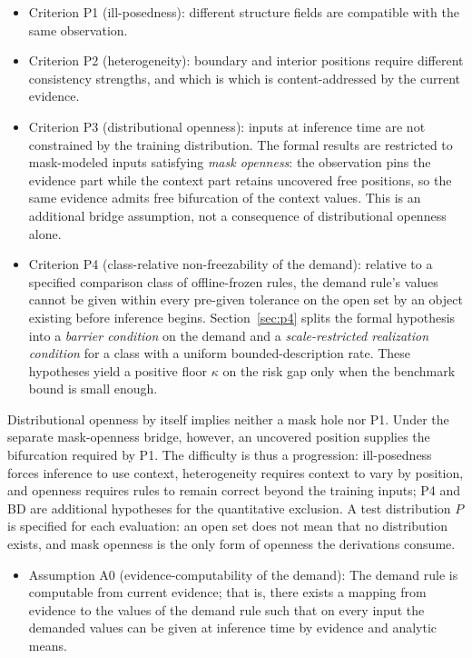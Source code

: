 \documentclass[twoside,11pt]{article}
\begin{document}
\begin{itemize}
\item Criterion P1 (ill-posedness): different structure fields are compatible with the same observation.
\item Criterion P2 (heterogeneity): boundary and interior positions require different consistency strengths, and which is which is content-addressed by the current evidence.
\item Criterion P3 (distributional openness): inputs at inference time are not constrained by the training distribution. The formal results are restricted to mask-modeled inputs satisfying \emph{mask openness}: the observation pins the evidence part while the context part retains uncovered free positions, so the same evidence admits free bifurcation of the context values. This is an additional bridge assumption, not a consequence of distributional openness alone.
\item Criterion P4 (class-relative non-freezability of the demand): relative to a specified comparison class of offline-frozen rules, the demand rule's values cannot be given within every pre-given tolerance on the open set by an object existing before inference begins. Section~\ref{sec:p4} splits the formal hypothesis into a \emph{barrier condition} on the demand and a \emph{scale-restricted realization condition} for a class with a uniform bounded-description rate. These hypotheses yield a positive floor $\kappa$ on the risk gap only when the benchmark bound is small enough.
\end{itemize}

Distributional openness by itself implies neither a mask hole nor P1. Under the separate mask-openness bridge, however, an uncovered position supplies the bifurcation required by P1. The difficulty is thus a progression: ill-posedness forces inference to use context, heterogeneity requires context to vary by position, and openness requires rules to remain correct beyond the training inputs; P4 and BD are additional hypotheses for the quantitative exclusion. A test distribution $P$ is specified for each evaluation: an open set does not mean that no distribution exists, and mask openness is the only form of openness the derivations consume.

\begin{itemize}
\item Assumption A0 (evidence-computability of the demand): The demand rule is computable from current evidence; that is, there exists a mapping from evidence to the values of the demand rule such that on every input the demanded values can be given at inference time by evidence and analytic means.
\end{itemize}
\end{document}
